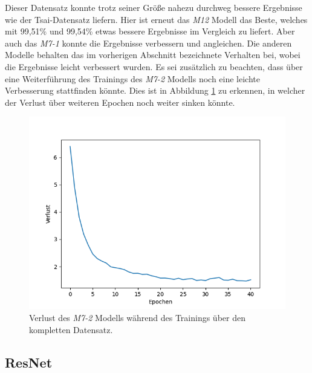 \documentclass[twoside,a4paper]{IEEEtran}
\begin{document}
Dieser Datensatz konnte trotz seiner Größe nahezu durchweg bessere Ergebnisse wie der Tsai-Datensatz liefern. Hier ist erneut das \emph{M12} Modell das Beste, welches mit 99,51\% und 99,54\% etwas bessere Ergebnisse im Vergleich zu \cite{RHC} liefert. Aber auch das \emph{M7-1} konnte die Ergebnisse verbessern und angleichen. Die anderen Modelle behalten das im vorherigen Abschnitt bezeichnete Verhalten bei, wobei die Ergebnisse leicht verbessert wurden. Es sei zusätzlich zu beachten, dass über eine Weiterführung des Trainings des \emph{M7-2} Modells noch eine leichte Verbesserung stattfinden könnte. Dies ist in Abbildung \ref{loss} zu erkennen, in welcher der Verlust über weiteren Epochen noch weiter sinken könnte.

\begin{figure}[!htb]
	\centering
	\includegraphics[width=\columnwidth]{loss}
	\caption{Verlust des \emph{M7-2} Modells während des Trainings über den kompletten Datensatz.}
	\label{loss}
\end{figure}

\subsection{ResNet}
\end{document}
